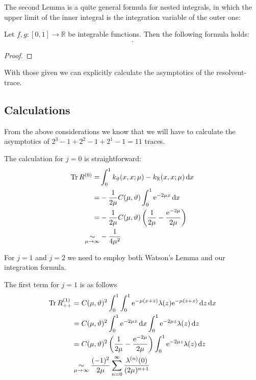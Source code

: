 The second Lemma is a quite general formula for nested integrals, in which the
upper limit of the inner integral is the integration variable of the outer one:
\begin{Lemma}
    Let $f,g\colon[0,1]\to\mathbb{R}$ be integrable functions. Then the
    following formula holds:
    \begin{align}
        .
        \label{eqn:integ-formula}
    \end{align}
    \begin{proof}
    \end{proof}
\end{Lemma}

With those given we can explicitly calculate the asymptotics of the
resolvent-trace.

\subsection{Calculations}
From the above considerations we know that we will have to calculate the
asymptotics of $2^3 - 1 + 2^2 - 1 + 2^1 - 1 = 11$ traces.

The calculation for $j=0$ is straightforward:
\begin{align}
    \Tr R^{(0)} =& \Integ[1]{0}{x}{k_\theta(x,x;\mu) - k_\mathbb{R}(x,x;\mu)} \\
    =& -\frac1{2\mu} C(\mu,\theta) \Integ[1]{0}{x}{\Eto{-2\mu x}} \\
    =& -\frac1{2\mu} C(\mu,\theta) \left( \frac1{2\mu} - \frac{\Eto{-2\mu}}{2\mu} \right) \\
    \SimAs{\mu\to\infty}& -\frac1{4\mu^2}
    \label{eqn:jeq0}
\end{align}

For $j=1$ and $j=2$ we need to employ both Watson's Lemma and our integration
formula.

The first term for $j=1$ is as follows
\begin{align*}
    \Tr R^{(1)}_{++} &= C(\mu,\theta)^2
        \Integ[1]{0}{x}{
            \Integ[1]{0}{z}{\Eto{-\mu(x+z)}
                \lambda(z)\Eto{-\mu(z+x)}
            }
        }
        \\
        &= C(\mu,\theta)^2
            \Integ[1]{0}{x}{
                \Eto{-2\mu x}
            }
            \Integ[1]{0}{z}{\Eto{-2\mu z}\lambda(z)}
        \\
        &= C(\mu, \theta)^2 \left(
            \frac1{2\mu} - \frac{\Eto{-2\mu}}{2\mu}
           \right)
           \Integ[1]{0}{z}{\Eto{-2\mu z}\lambda(z)}
        \\
        &\SimAs{\mu\to\infty}
            \frac{(-1)^2}{2\mu}
            \sum_{n=0}^{\infty}\frac{\lambda^{(n)}(0)}{(2\mu)^{n+1}}
\end{align*}

